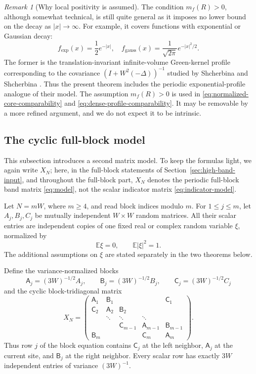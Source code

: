 \documentclass[11pt,reqno]{amsart}
\numberwithin{equation}{section}
\theoremstyle{definition}
\theoremstyle{remark}
\newtheorem{remark}[theorem]{Remark}
\newcommand{\1}{\mathbf 1}
\begin{document}
\begin{remark}[Why local positivity is assumed]
\label{rem:gaussian-local-positivity}
The condition $m_f(R)>0$, although somewhat technical, is still quite general
as it imposes no lower bound on the decay as $|x|\to\infty$.  For example, it
covers functions with exponential or Gaussian decay:
\[
 f_{\exp}(x)=\frac12e^{-|x|},\quad
 f_{\text{gauss}}(x)=\frac{1}{\sqrt{2\pi}}e^{-|x|^2/2}.
\]
The former is the translation-invariant infinite-volume
Green-kernel profile corresponding to the covariance
$(I+W^2(-\Delta))^{-1}$ studied by Shcherbina and Shcherbina
\cite{ShcherbinaShcherbina2025}.  Thus the present theorem includes the
periodic exponential-profile analogue of their model.  The assumption
$m_f(R)>0$ is used in
\eqref{eq:normalized-core-comparability} and
\eqref{eq:dense-profile-comparability}.  It may be removable by a more
refined argument, and we do not expect it to be intrinsic.
\end{remark}

\subsection{The cyclic full-block model}

This subsection introduces a second matrix model.  To keep the formulas
light, we again write \(X_N\); here, in the full-block statements of
Section~\ref{sec:high-band-input}, and throughout the full-block part,
\(X_N\)
denotes the periodic full-block band matrix \eqref{eq:model}, not the
scalar indicator matrix \eqref{eq:indicator-model}.

Let \(N=mW\), where \(m\ge 4\), and read block indices modulo \(m\).
For \(1\le j\le m\), let \(A_j,B_j,C_j\) be mutually independent
\(W\times W\) random matrices.  All their scalar entries are independent
copies of one fixed real or complex random variable \(\xi\), normalized by
\begin{equation}
 \mathbb E\xi=0,\qquad \mathbb E|\xi|^2=1.
 \label{eq:atom}
\end{equation}
The additional assumptions on \(\xi\) are stated separately in the two
theorems below.

Define the variance-normalized blocks
\[
 \mathsf A_j=(3W)^{-1/2}A_j,\qquad
 \mathsf B_j=(3W)^{-1/2}B_j,\qquad
 \mathsf C_j=(3W)^{-1/2}C_j
\]
and the cyclic block-tridiagonal matrix
\begin{equation}
 X_N=
 \begin{pmatrix}
  \mathsf A_1&\mathsf B_1&&&\mathsf C_1\\
  \mathsf C_2&\mathsf A_2&\mathsf B_2&&\\
  &\ddots&\ddots&\ddots&\\
  &&\mathsf C_{m-1}&\mathsf A_{m-1}&\mathsf B_{m-1}\\
  \mathsf B_m&&&\mathsf C_m&\mathsf A_m
 \end{pmatrix}.
 \label{eq:model}
\end{equation}
Thus row \(j\) of the block equation contains
\(\mathsf C_j\) at the left neighbor, \(\mathsf A_j\) at the current
site, and \(\mathsf B_j\) at the right neighbor.  Every scalar row has
exactly \(3W\) independent entries of variance \((3W)^{-1}\).
\end{document}
